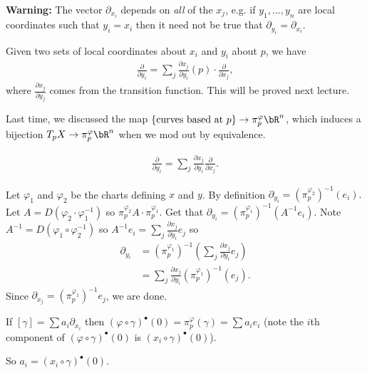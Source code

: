 \textbf{Warning:} The vector $\partial_{x_i}$ depends on \emph{all} of the $x_j$, e.g. if $y_1,...,y_n$ are local coordinates such that $y_i = x_i$ then it need not be true that $\partial_{y_i} = \partial_{x_i}$.

\begin{lem}
	Given two sets of local coordinates about $x_i$ and $y_i$ about $p$, we have
	\begin{align*}
		\frac{\partial}{\partial y_i} = \sum_j \frac{\partial x_j}{\partial y_i}(p) \cdot \frac{\partial}{\partial x_j},
	\end{align*}
	where $\frac{\partial x_j}{\partial y_j}$ comes from the transition function. This will be proved next lecture.
\end{lem}

Last time, we discussed the map $\{\text{curves based at $p$}\} \to{\pi_p^\varphi} \bR^n$, which induces a bijection $T_pX \to{\pi_p^\varphi} \bR^n$ when we mod out by equivalence. 

\begin{lem}
	\begin{align*}
		\frac{\partial}{\partial y_i} = \sum_j \frac{\partial x_j}{\partial y_i} \frac{\partial}{\partial x_j}.
	\end{align*}
\end{lem}
\begin{prf}
	Let $\varphi_1$ and $\varphi_2$ be the charts defining $x$ and $y$. By definition $\partial_{y_i} = \left(\pi_p^{\varphi_2}\right)^{-1}(e_i).$ Let $A = D(\varphi_2\cdot \varphi_1^{-1})$ so $\pi_p^{\varphi_2} A\cdot \pi_p^{\varphi_1}$. Get that $\partial_{y_i} = \left(\pi_p^{\varphi_1}\right)^{-1} (A^{-1}e_i)$. Note $A^{-1} = D(\varphi_1 \circ \varphi_2^{-1})$ so $A^{-1}e_i = \sum_j \frac{\partial x_j}{\partial y_i}e_j$ so
	\begin{align*}
		\partial_{y_i} &= \left(\pi_p^{\varphi_1}\right)^{-1}\left(\sum_j \frac{\partial x_j}{\partial y_i} e_j\right) \\
					   &= \sum_j \frac{\partial x_j}{\partial y_i} (\pi_p^{\varphi_1})^{-1}(e_j).
	\end{align*}
	Since $\partial_{x_j} = (\pi_p^{\varphi_1})^{-1}e_j$, we are done.
\end{prf}
\begin{rmk}\label{rmk:1.39}
	If $[\gamma] = \sum a_i \partial_{x_i}$ then $(\varphi\circ \gamma)^\bullet(0) = \pi_p^{\varphi}(\gamma) = \sum a_i e_i$ (note the $i$th component of $(\varphi \circ \gamma)^\bullet(0)$ is $(x_i \circ \gamma)^\bullet(0)$).

	So $a_i = (x_i \circ \gamma)^\bullet(0)$.
\end{rmk}

